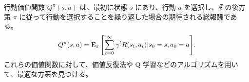 行動価値関数 $Q^{\pi}(s, a)$ は、最初に状態 $s$ にあり、行動 $a$ を選択し、その後方策 $\pi$ に従って行動を選択することを繰り返した場合の期待される総報酬である。
\begin{align}
    Q^{\pi}(s, a) = \operatorname{E}_{\pi}\qty[\sum_{t=0}^{\infty} \gamma^t R(s_t, a_t) | s_0 = s, a_0 = a].
\end{align}
これらの価値関数に対して、価値反復法や Q 学習などのアルゴリズムを用いて、最適な方策を見つける。








